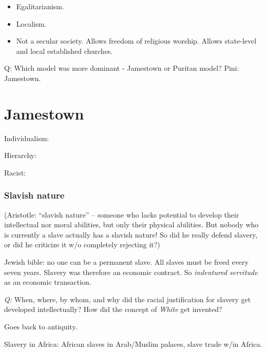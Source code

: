 \documentclass[
]{book}
\providecommand{\tightlist}{%
  \setlength{\itemsep}{0pt}\setlength{\parskip}{0pt}}
\begin{document}
\begin{itemize}
\tightlist
\item
  Egalitarianism.
\item
  Localism.
\item
  Not a secular society. Allows freedom of religious worship. Allows state-level and local established churches.
\end{itemize}

Q: Which model was more dominant - Jamestown or Puritan model?
Pini: Jamestown.

\hypertarget{jamestown-1}{%
\section{Jamestown}\label{jamestown-1}}

Individualism:

Hierarchy:

Racist:

\hypertarget{slavish-nature}{%
\subsubsection{Slavish nature}\label{slavish-nature}}

(Aristotle: ``slavish nature'' -- someone who lacks potential to develop their intellectual nor moral abilities, but only their physical abilities. But nobody who is currently a slave actually has a slavish nature! So did he really defend slavery, or did he criticize it w/o completely rejecting it?)

Jewish bible: no one can be a permanent slave. All slaves must be freed every seven years. Slavery was therefore an economic contract. So \emph{indentured servitude} as an economic transaction.

\emph{Q:} When, where, by whom, and why did the racial justification for slavery get developed intellectually? How did the concept of \emph{White} get invented?

Goes back to antiquity.

Slavery in Africa: African slaves in Arab/Muslim palaces, slave trade w/in Africa.
\end{document}
